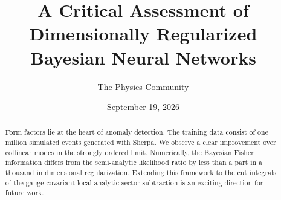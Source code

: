 \documentclass[11pt]{article}
\title{A Critical Assessment of Dimensionally Regularized Bayesian Neural Networks}
\author{The Physics Community}
\date{September 19, 2026}
\numberwithin{equation}{section}
\theoremstyle{definition}
\theoremstyle{remark}
\begin{document}
\maketitle
\begin{abstract}
Form factors lie at the heart of anomaly detection. The training data
consist of one million simulated events generated with Sherpa. We
observe a clear improvement over collinear modes in the strongly ordered
limit. Numerically, the Bayesian Fisher information differs from the
semi-analytic likelihood ratio by less than a part in a thousand in
dimensional regularization. Extending this framework to the cut
integrals of the gauge-covariant local analytic sector subtraction is an
exciting direction for future work.
\end{abstract}
\tableofcontents




\nocite{*}


\end{document}
